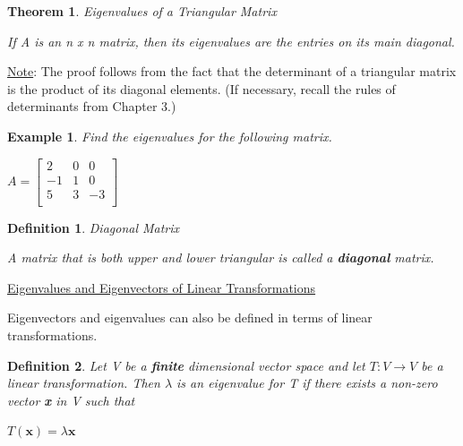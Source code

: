 \documentclass[12pt]{article}
\newtheorem{thm}{Theorem}
\newtheorem{dfn}{Definition}
\newtheorem{ex}{Example}
\newcommand{\tbf}{\textbf}
\begin{document}
\pagebreak
\begin{thm} Eigenvalues of a Triangular Matrix

If A is an n x n matrix, then its eigenvalues are the entries on its main diagonal. 
\end{thm}

\underline{Note}: The proof follows from the fact that the determinant of a triangular matrix is the product of its diagonal elements. (If necessary, recall the rules of determinants from Chapter 3.)

\vspace{.1in}

\begin{ex}

Find the eigenvalues for the following matrix.

\begin{center}
$A = \begin{bmatrix}
2	&	0	&	0\\
-1	&	1	&	0\\
5	&	3	&	-3\\
\end{bmatrix}$
\end{center}
\end{ex}

\vfill

\begin{dfn} Diagonal Matrix

A matrix that is both upper and lower triangular is called a \tbf{diagonal} matrix.

\end{dfn}

\vfill




\begin{center}
\underline{Eigenvalues and Eigenvectors of Linear Transformations}
\end{center}

Eigenvectors and eigenvalues can also be defined in terms of linear transformations. 

\begin{dfn}
Let V be a \tbf{finite} dimensional vector space and let  $T: V \rightarrow V$  be a linear transformation. Then $\lambda$ is an eigenvalue for T if there exists a non-zero vector \tbf{x} in V such that

\begin{center}
$T(\tbf{x}) = \lambda \tbf{x}$  
\end{center}

\end{dfn}
\end{document}
